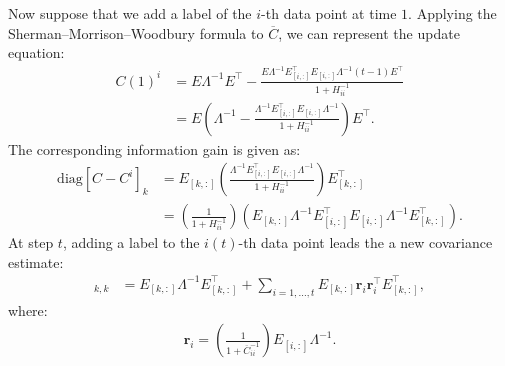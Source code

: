 \documentclass{article}
\newcommand{\mbr}{\mathbf{r}}
\begin{document}
Now suppose that we add a label of the $i$-th data point at time $1$. Applying the Sherman--Morrison--Woodbury formula to $\overline{C}$, we can represent the update equation:
\begin{align}
C(1)^i &=E \Lambda^{-1}E^\top - \frac{E \Lambda^{-1} E_{[i,:]}^\top E_{[i,:]} \Lambda^{-1}(t-1) E^\top  }{1+H^{-1}_{ii}}\nonumber\\
&=E \left(\Lambda^{-1}  - \frac{\Lambda^{-1} E_{[i,:]}^\top E_{[i,:]} \Lambda^{-1} }{1+H^{-1}_{ii}}\right)E^\top.\nonumber
\end{align}
The corresponding information gain is given as:
\begin{align}
\text{diag}[C-C^i]_k &= E_{[k,:]} \left(\frac{\Lambda^{-1} E_{[i,:]}^\top E_{[i,:]} \Lambda^{-1}}{1+H^{-1}_{ii}}\right)E_{[k,:]}^\top \nonumber\\
&= \left(\frac{1}{1+H^{-1}_{ii}}\right) \left(E_{[k,:]}\Lambda^{-1} E_{[i,:]}^\top E_{[i,:]} \Lambda^{-1}E_{[k,:]}^\top\right).
\label{e:updateequ}
\end{align}
At step $t$, adding a label to the $i(t)$-th data point leads the a new covariance estimate:
\begin{align}[EF_iE^\top]_{k,k} &= E_{[k,:]}\Lambda^{-1}E_{[k,:]}^\top+\sum_{i=1,\ldots,t} E_{[k,:]}\mbr_i \mbr_i^\top E_{[k,:]}^\top,\nonumber
\label{e:eigenupdate}
\end{align}
where:
\begin{align}
\mbr_i= \left(\frac{1}{1+\overline{C}^{-1}_{ii}}\right)E_{[i,:]} \Lambda^{-1}.
\end{align}
\end{document}
